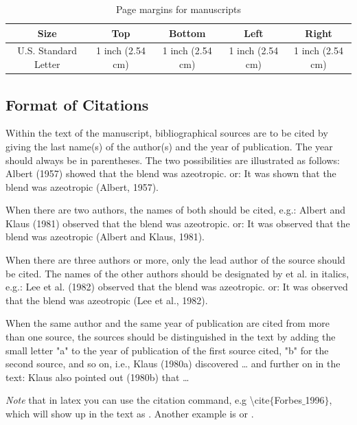 \documentclass[10pt]{extarticle}
\begin{document}
\begin{table}
\centering
\begin{tabular}{|c|c|c|c|c|}
\hline
Size & Top & Bottom & Left & Right \\ 
\hline 
U.S. Standard Letter & 1 inch (2.54 cm) & 1 inch (2.54 cm) & 1 inch (2.54 cm) & 1 inch (2.54 cm) \\ 
\hline 
\end{tabular}
\caption{Page margins for manuscripts}
\end{table} 
 
\subsection{Format of Citations}
Within the text of the manuscript, bibliographical sources are to be cited by giving the last name(s) of the author(s) and the year of publication.  The year should always be in parentheses.  The two possibilities are illustrated as follows:
	Albert (1957) showed that the blend was azeotropic.
or:	It was shown that the blend was azeotropic (Albert, 1957).

When there are two authors, the names of both should be cited, e.g.:
	Albert and Klaus (1981) observed that the blend was azeotropic.
or:	It was observed that the blend was azeotropic (Albert and Klaus, 1981).

When there are three authors or more, only the lead author of the source should be cited. The names of the other authors should be designated by et al. in italics, e.g.:
	Lee et al. (1982) observed that the blend was azeotropic.
or:	It was observed that the blend was azeotropic (Lee et al., 1982).

When the same author and the same year of publication are cited from more than one source, the sources should be distinguished in the text by adding the small letter "a" to the year of publication of the first source cited, "b" for the second source, and so on, i.e.,
	Klaus (1980a) discovered … and further on in the text:
	Klaus also pointed out (1980b) that …

\emph{Note} that in latex you can use the citation command, e.g \textbackslash cite$\{$Forbes$\_$1996$\}$, which will show up in the text as \cite{Forbes_1996}. Another example is \cite{Zhou_1997} or \cite{Kaern_2011}.
\end{document}
